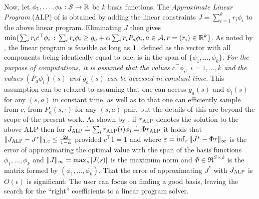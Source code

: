 \documentclass[twocolumn]{IEEEtran}
\begin{document}
Now, let $\phi_1,\ldots,\phi_k : \S \to \Re$ be $k$ basis functions.
The \emph{Approximate Linear Program} (ALP) of \citet{SchSei85}
is obtained by adding the linear constraints $J = \sum_{i=1}^k r_i \phi_i$ to the above linear program. Eliminating $J$ then gives $\min\{ \sum_i r_i c^\top \phi_i \,:\, \sum_i r_i \phi_i \ge g_a + \alpha \sum_i r_i P_a \phi_i, a\in \A, r = (r_i)\in \Re^k \}$.
As noted by \citet{SchSei85}, the linear program is feasible as long as $\one$, defined as the vector with all components being identically equal to one, is in the span of $\{\phi_1,\dots,\phi_k\}$.
\emph{For the purpose of computations, it is assumed that the values $c^\top \phi_i$, $i=1,\dots, k$ and the values $(P_a \phi_i)(s)$ and $g_a(s)$ can be accessed in constant time.}
This assumption can be relaxed to assuming that one can access $g_a(s)$ and $\phi_i(s)$ for any $(s,a)$ in constant time, as well as to that one can efficiently sample from $c$, from $P_a(s,\cdot)$ for any $(s,a)$ pair,
but the details of this are beyond the scope of the present work. As shown by \citet{ALP}, if $\ralp$ denotes the solution to the above ALP then for $\Jalp \doteq \sum_i \ralp(i) \phi_i \doteq \Phi \ralp$ it holds that $\norm{\Jalp - J^*}_{1,c} \le \frac{2 \epsilon}{1-\alpha}$ provided $c^\top 1 = 1$ and where $\epsilon = \inf_r \norm{ J^* - \Phi r }_\infty$ is the error of approximating the optimal value with the span of the basis functions $\phi_1,\dots,\phi_k$ and $\norm{J}_\infty = \max_s |J(s)|$ is the maximum norm and $\Phi \in \Re^{S\times k}$ is the matrix formed by $(\phi_1,\dots,\phi_k)$. That the error of approximating $J^*$ with $\Jalp$ is $O(\epsilon)$ is significant: The user can focus on finding a good basis, leaving the search for the ``right'' coefficients to a linear program solver.
\end{document}
